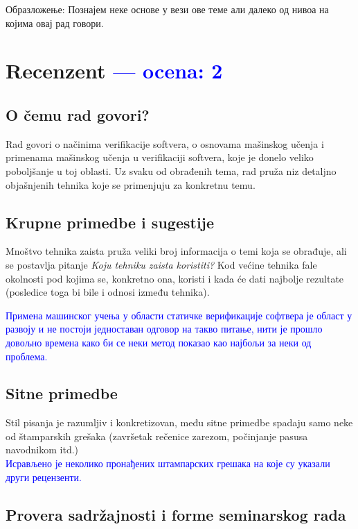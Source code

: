 \documentclass[a4paper]{report}
\newcommand{\odgovor}[1]{\textcolor{blue}{#1}}
\newcommand{\say}[1]{\textit{#1}}
\begin{document}
Образложење: Познајем неке основе у вези ове теме али далеко од нивоа на којима овај рад говори.


\chapter{Recenzent \odgovor{--- ocena: 2} }


\section{O čemu rad govori?}
Rad govori o načinima verifikacije softvera, o osnovama mašinskog učenja i primenama mašinskog učenja u verifikaciji softvera, koje je donelo veliko poboljšanje u toj oblasti. Uz svaku od obrađenih tema, rad pruža niz detaljno objašnjenih tehnika koje se primenjuju za konkretnu temu.

\section{Krupne primedbe i sugestije}
Mnoštvo tehnika zaista pruža veliki broj informacija o temi koja se obrađuje, ali se postavlja pitanje \say {Koju tehniku zaista koristiti?} Kod većine tehnika fale okolnosti pod kojima se, konkretno ona, koristi i kada će dati najbolje rezultate (posledice toga bi bile i odnosi između tehnika).

\odgovor{Примена машинског учења у области статичке верификације софтвера је област у развоју и не постоји
    једноставан одговор на такво питање, нити је прошло довољно времена како би се неки метод показао као најбољи за неки од проблема.
}
\\

\section{Sitne primedbe}
Stil pisanja je razumljiv i konkretizovan, među sitne primedbe spadaju samo neke od štamparskih grešaka (završetak rečenice zarezom, počinjanje pasusa navodnikom itd.)\\

\odgovor{Исрављено је неколико пронађених штампарских грешака на које су указали други рецензенти.}
\\


\section{Provera sadržajnosti i forme seminarskog rada}
\end{document}
